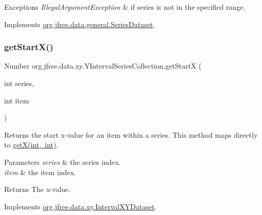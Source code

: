 \begin{DoxyExceptions}{Exceptions}
{\em Illegal\+Argument\+Exception} & if {\ttfamily series} is not in the specified range. \\
\hline
\end{DoxyExceptions}


Implements \mbox{\hyperlink{interfaceorg_1_1jfree_1_1data_1_1general_1_1_series_dataset_a60488892b2314a05a012999e26a74178}{org.\+jfree.\+data.\+general.\+Series\+Dataset}}.

\mbox{\label{classorg_1_1jfree_1_1data_1_1xy_1_1_y_interval_series_collection_a9675b5f0ee4eb7b9e0478844d2df61d0}} 
\subsubsection{\texorpdfstring{get\+Start\+X()}{getStartX()}}
{\footnotesize\ttfamily Number org.\+jfree.\+data.\+xy.\+Y\+Interval\+Series\+Collection.\+get\+StartX (\begin{DoxyParamCaption}\item[{int}]{series,  }\item[{int}]{item }\end{DoxyParamCaption})}

Returns the start x-\/value for an item within a series. This method maps directly to \mbox{\hyperlink{classorg_1_1jfree_1_1data_1_1xy_1_1_y_interval_series_collection_aea821e6f7de4ea55e3ebf533ae124c10}{get\+X(int, int)}}.


\begin{DoxyParams}{Parameters}
{\em series} & the series index. \\
\hline
{\em item} & the item index.\\
\hline
\end{DoxyParams}
\begin{DoxyReturn}{Returns}
The x-\/value. 
\end{DoxyReturn}


Implements \mbox{\hyperlink{interfaceorg_1_1jfree_1_1data_1_1xy_1_1_interval_x_y_dataset_a7548ec7d60d72463313dc6f10aceee62}{org.\+jfree.\+data.\+xy.\+Interval\+X\+Y\+Dataset}}.

